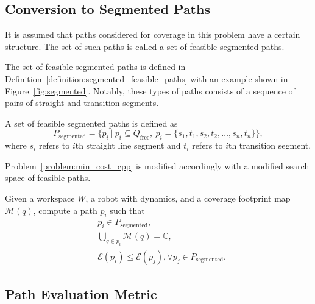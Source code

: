 \documentclass[../main.tex]{subfiles}
\begin{document}
\subsection{Conversion to Segmented Paths}
\label{subsection:conversion_to_segmented}

\begin{assumption}
It is assumed that paths considered for coverage in this problem have a certain structure. The set of such paths is called a set of feasible segmented paths.
\end{assumption}

The set of feasible segmented paths is defined in Definition~\ref{definition:segmented_feasible_paths} with an example shown in Figure~\ref{fig:segmented}. Notably, these types of paths consists of a sequence of pairs of straight and transition segments.
\begin{definition}
\label{definition:segmented_feasible_paths}
A set of feasible segmented paths is defined as
	\begin{equation}
		P_{\text{segmented}}=\{p_i\ |\ p_i\subseteq Q_{\text{free}},\  p_i=\{s_1,t_1,s_2,t_2,\dots,s_n,t_n\}\},
	\end{equation}
	where $s_i$ refers to $i$th straight line segment and $t_i$ refers to $i$th transition segment.
\end{definition}

Problem~\ref{problem:min_cost_cpp} is modified accordingly with a modified search space of feasible paths.
\begin{problem}
\label{problem:min_cost_cpp_with_lines}
	Given a workspace $W$, a robot with dynamics, and a coverage footprint map $\mathcal{M}(q)$, compute a path $p_i$ such that
	\begin{equation}
	\label{condition:full_coverage_2}
	\begin{aligned}
		& p_i\in P_{\text{segmented}},\\
		& \bigcup_{q\in p_i}\mathcal{M}(q)=\mathbb{C},\\
		& \mathcal{E}(p_i)\leq\mathcal{E}(p_j), \forall p_j\in P_{\text{segmented}}.
	\end{aligned}
	\end{equation}
\end{problem}


\subsection{Path Evaluation Metric}
\label{subsection:path_cost_design}
\end{document}

